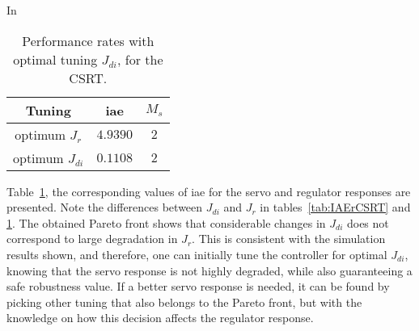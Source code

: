 In %
%
\begin{table}
	\caption{Performance rates with optimal tuning $J_{di}$, for the CSRT.}
	\centering
	\begin{tabular}{@{}*{3}{c}@{}}
		\toprule
		Tuning            &\gls{iae}        &$M_s$   \\
		\midrule              
		optimum $J_{r}$    &$4.9390$   & $2$    \\
		optimum $J_{di}$   &$0.1108$   & $2$    \\
		\bottomrule				
	\end{tabular}
	\label{tab:IAEdiCSRT}
\end{table}
%
Table~\ref{tab:IAEdiCSRT}, the corresponding values of \gls{iae} for the servo and regulator responses are presented. Note the differences between $J_{di}$ and $J_{r}$ in tables~\ref{tab:IAErCSRT} and \ref{tab:IAEdiCSRT}. The obtained Pareto front shows that considerable changes in $J_{di}$ does not correspond to large degradation in $J_{r}$. This is consistent with the simulation results shown, and therefore, one can initially tune the controller for optimal $J_{di}$, knowing that the servo response is not highly degraded, while also guaranteeing a safe robustness value. If a better servo response is needed, it can be found by picking other tuning that also belongs to the Pareto front, but with the knowledge on how this decision affects the regulator response.